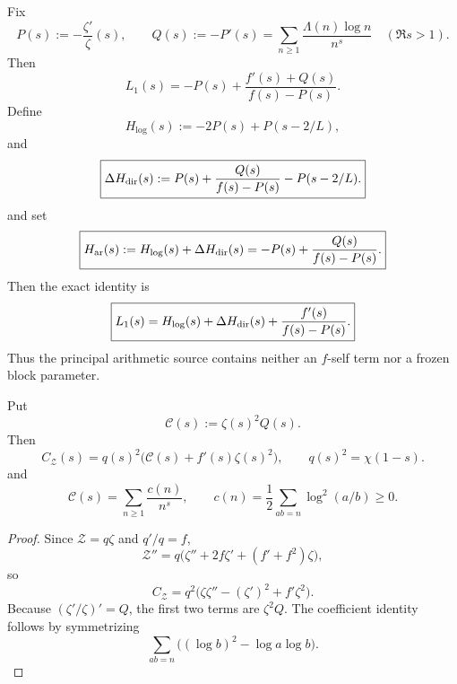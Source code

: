 Fix
\begin{equation}
P(s):=-\frac{\zeta'}\zeta(s),
\qquad
Q(s):=-P'(s)=\sum_{n\ge1}\frac{\Lambda(n)\log n}{n^s}
\quad(\Re s>1).
\label{eq:PQ-convention}
\end{equation}
Then
\begin{equation}
\boxed{
L_1(s)=-P(s)+\frac{f'(s)+Q(s)}{f(s)-P(s)}.
}
\label{eq:L1-safe-line}
\end{equation}
Define
\begin{equation}
\boxed{H_{\log}(s):=-2P(s)+P(s-2/L),}
\label{eq:Hlog}
\end{equation}
and
\begin{equation}
\boxed{
\Delta H_{\rm dir}(s)
:=P(s)+\frac{Q(s)}{f(s)-P(s)}-P(s-2/L).
}
\label{eq:deltaH-dir}
\end{equation}
and set
\begin{equation}
\boxed{
H_{\rm ar}(s):=H_{\log}(s)+\Delta H_{\rm dir}(s)
=-P(s)+\frac{Q(s)}{f(s)-P(s)}.
}
\label{eq:exact-arithmetic-source}
\end{equation}
Then the exact identity is
\begin{equation}
\boxed{
L_1(s)=H_{\log}(s)+\Delta H_{\rm dir}(s)
      +\frac{f'(s)}{f(s)-P(s)}.
}
\label{eq:L1-logonly-split}
\end{equation}
Thus the principal arithmetic source contains neither an $f$-self term nor a
frozen block parameter.

\begin{lemma}
\label{lem:curvature-source}
Put
\[
\mathcal C(s):=\zeta(s)^2Q(s).
\]
Then
\begin{equation}
\boxed{
C_{\mathscr Z}(s)
=q(s)^2\bigl(\mathcal C(s)+f'(s)\zeta(s)^2\bigr),
\qquad q(s)^2=\chi(1-s).
}
\label{eq:curvature-source}
\end{equation}
and
\begin{equation}
\mathcal C(s)=\sum_{n\ge1}\frac{c(n)}{n^s},
\qquad
\boxed{c(n)=\frac12\sum_{ab=n}\log^2(a/b)\ge0.}
\label{eq:curvature-coefficient}
\end{equation}
\end{lemma}

\begin{proof}
Since $\mathscr Z=q\zeta$ and $q'/q=f$,
\[
\mathscr Z''=q\bigl(\zeta''+2f\zeta'+(f'+f^2)\zeta\bigr),
\]
so
\[
C_{\mathscr Z}
=q^2\bigl(\zeta\zeta''-(\zeta')^2+f'\zeta^2\bigr).
\]
Because $(\zeta'/\zeta)'=Q$, the first two terms are $\zeta^2Q$.
The coefficient identity follows by symmetrizing
\[
\sum_{ab=n}\bigl((\log b)^2-\log a\log b\bigr).
\]
\end{proof}

